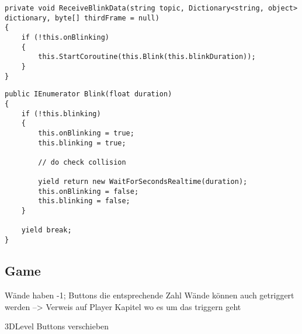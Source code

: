 \begin{lstlisting}[caption=Methode ReceiveBlinkData,label=lstlisting:ReceiveBlinkData]
private void ReceiveBlinkData(string topic, Dictionary<string, object> dictionary, byte[] thirdFrame = null)
{
	if (!this.onBlinking)
	{
		this.StartCoroutine(this.Blink(this.blinkDuration));
	}
}
\end{lstlisting}

\begin{lstlisting}[caption=Ausschnitt aus Methode Blink,label=lstlisting:Blink]
public IEnumerator Blink(float duration)
{
	if (!this.blinking)
	{
		this.onBlinking = true;
		this.blinking = true;
		
		// do check collision
		
		yield return new WaitForSecondsRealtime(duration);
		this.onBlinking = false;
		this.blinking = false;
	}
	
	yield break;
}
\end{lstlisting}

\subsection{Game}
\label{section:game}

Wände haben -1; Buttons die entsprechende Zahl
Wände können auch getriggert werden --> Verweis auf Player Kapitel wo es um das triggern geht

3DLevel Buttons verschieben



